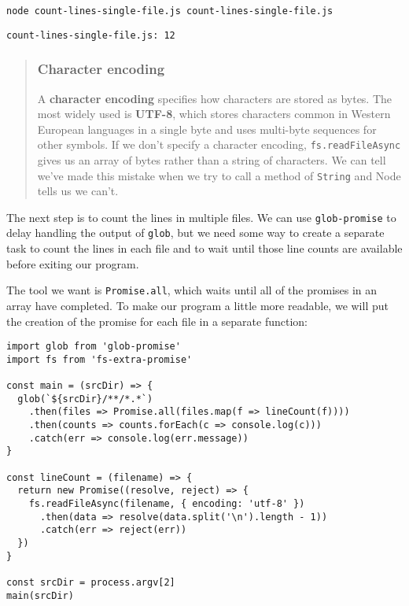 \documentclass[krantzl]{krantz}
\newcommand{\glossref}[1]{\textbf{#1}}
\newenvironment{callout}{\savenotes\begin{tBox}\begin{quotation}\toggletrue{inbox}\renewcommand{\thempfootnote}{\arabic{footnote}}}{\end{quotation}\vspace{\baselineskip}\end{tBox}\togglefalse{inbox}\spewnotes}
\begin{document}
\begin{lstlisting}[frame=single,frameround=tttt]
node count-lines-single-file.js count-lines-single-file.js
\end{lstlisting}



\begin{lstlisting}[frame=single,frameround=tttt]
count-lines-single-file.js: 12
\end{lstlisting}


\begin{callout}


\subsubsection*{Character encoding}


A \glossref{character encoding} specifies how characters are stored as bytes.
The most widely used is \glossref{UTF-8},
which stores characters common in Western European languages in a single byte
and uses multi-byte sequences for other symbols.
If we don't specify a character encoding,
\texttt{fs.readFileAsync} gives us an array of bytes rather than a string of characters.
We can tell we've made this mistake when we try to call a method of \texttt{String}
and Node tells us we can't.

\end{callout}


The next step is to count the lines in multiple files.
We can use \texttt{glob-promise} to delay handling the output of \texttt{glob},
but we need some way to create a separate task to count the lines in each file
and to wait until those line counts are available before exiting our program.


The tool we want is \texttt{Promise.all},
which waits until all of the promises in an array have completed.
To make our program a little more readable,
we will put the creation of the promise for each file in a separate function:


\begin{lstlisting}[frame=single,frameround=tttt]
import glob from 'glob-promise'
import fs from 'fs-extra-promise'

const main = (srcDir) => {
  glob(`${srcDir}/**/*.*`)
    .then(files => Promise.all(files.map(f => lineCount(f))))
    .then(counts => counts.forEach(c => console.log(c)))
    .catch(err => console.log(err.message))
}

const lineCount = (filename) => {
  return new Promise((resolve, reject) => {
    fs.readFileAsync(filename, { encoding: 'utf-8' })
      .then(data => resolve(data.split('\n').length - 1))
      .catch(err => reject(err))
  })
}

const srcDir = process.argv[2]
main(srcDir)
\end{lstlisting}
\end{document}

